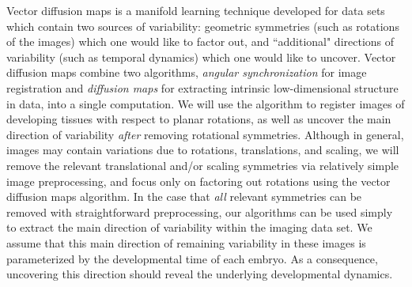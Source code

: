 \documentclass[twocolumn, 10pt]{article}
\begin{document}
Vector diffusion maps \citep{singer2012vector} is a manifold learning
technique developed for data sets which contain two sources of variability:
geometric symmetries (such as rotations of the images) which one would like to factor out,
and ``additional" directions of variability (such as temporal dynamics) which one would like to uncover.
%
Vector diffusion maps combine two algorithms, {\em angular synchronization} \citep{singer2011angular} for image registration and {\em diffusion maps} \citep{coifman2005geometric} for extracting intrinsic low-dimensional structure in data, into a single computation.
%
We will use the algorithm to register images of developing tissues with respect to planar rotations, as well as uncover the main direction of variability {\it after} removing rotational symmetries.
%
Although in general, images may contain variations due to rotations, translations, and scaling, we will remove the relevant translational and/or scaling symmetries via relatively simple image preprocessing, and focus only on factoring out rotations using the vector diffusion maps algorithm.
%
In the case that {\em all} relevant symmetries can be removed with straightforward preprocessing, our algorithms can be used simply to extract the main direction of variability within the imaging data set.
%
We assume that this main direction of remaining variability in these images is parameterized by the developmental time of each embryo.
%
As a consequence, uncovering this direction should reveal the underlying developmental dynamics.
\end{document}

